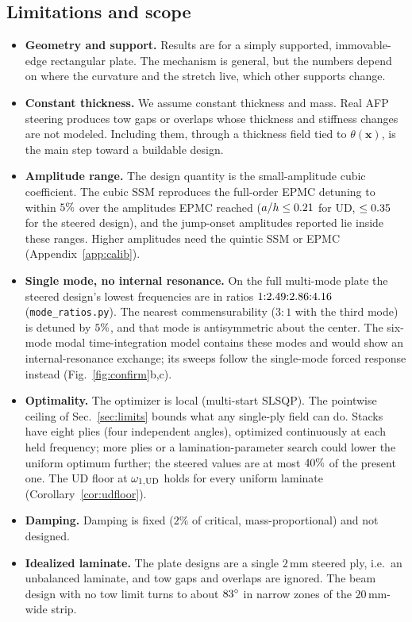 \subsection{Limitations and scope}
\begin{itemize}[itemsep=2pt]
\item \textbf{Geometry and support.} Results are for a simply supported, immovable-edge
  rectangular plate. The mechanism is general, but the numbers depend on where the
  curvature and the stretch live, which other supports change.
\item \textbf{Constant thickness.} We assume constant thickness and mass. Real AFP
  steering produces tow gaps or overlaps whose thickness and stiffness changes are not
  modeled. Including them, through a thickness field tied to $\theta(\bm x)$, is the main
  step toward a buildable design.
\item \textbf{Amplitude range.} The design quantity is the small-amplitude cubic
  coefficient. The cubic SSM reproduces the full-order EPMC detuning to within $5\%$
  over the amplitudes EPMC reached ($a/h\le0.21$ for UD, $\le0.35$ for the steered design),
  and the jump-onset amplitudes reported lie inside these ranges. Higher
  amplitudes need the quintic SSM or EPMC (Appendix~\ref{app:calib}).
\item \textbf{Single mode, no internal resonance.} On the full multi-mode plate the steered design's lowest
  frequencies are in ratios $1{:}2.49{:}2.86{:}4.16$ (\texttt{mode\_\allowbreak ratios.py}). The nearest
  commensurability ($3{:}1$ with the third mode) is detuned by $5\%$, and that mode
  is antisymmetric about the center. The six-mode modal time-integration model contains these modes
  and would show an internal-resonance exchange; its sweeps follow the single-mode forced
  response instead (Fig.~\ref{fig:confirm}b,c).
\item \textbf{Optimality.} The optimizer is local (multi-start SLSQP). The pointwise
  ceiling of Sec.~\ref{sec:limits} bounds what any single-ply field can do. Stacks have eight
  plies (four independent angles), optimized continuously at each held frequency; more
  plies or a lamination-parameter search could lower the uniform optimum further; the
  steered values are at most $40\%$ of the present one. The UD floor at
  $\omega_{1,\mathrm{UD}}$ holds for every uniform laminate (Corollary~\ref{cor:udfloor}).
\item \textbf{Damping.} Damping is fixed ($2\%$ of critical, mass-proportional) and not designed.
\item \textbf{Idealized laminate.} The plate designs are a single $2$\,mm steered ply,
  i.e.\ an unbalanced laminate, and tow gaps and overlaps are ignored. The beam design
  with no tow limit turns to about $83^\circ$ in narrow zones of the $20$\,mm-wide strip.
\end{itemize}

